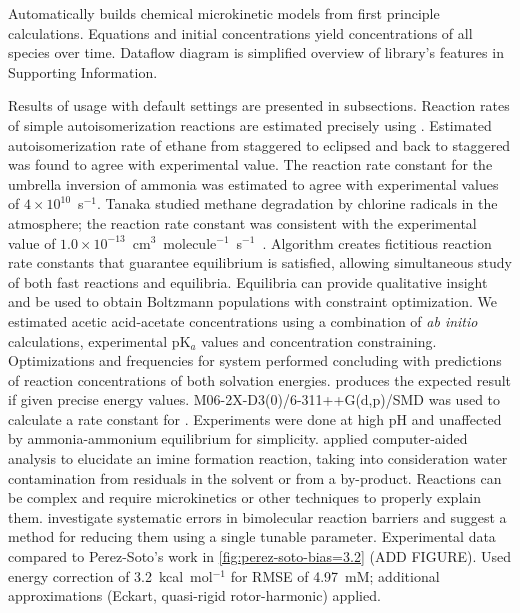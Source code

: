 Automatically builds chemical microkinetic models from first principle calculations.
Equations and initial concentrations yield concentrations of all species over time.
Dataflow diagram is simplified overview of library's features in Supporting Information.

Results of \overreact usage with default settings are presented in subsections.
Reaction rates of simple autoisomerization reactions are estimated precisely using \overreact.
Estimated autoisomerization rate of ethane from staggered to eclipsed and back to staggered was found to agree with experimental value.
The reaction rate constant for the umbrella inversion of ammonia was estimated to agree with experimental values of $4 \times 10^{10}$~s$^{-1}$.
Tanaka \cite{Tanaka_1996} studied methane degradation by chlorine radicals in the atmosphere; the reaction rate constant was consistent with the experimental value of $1.0 \times 10^{-13}$~cm$^3$~molecule$^{-1}$~s$^{-1}$~\cite{Burkholder_2020}.
Algorithm creates fictitious reaction rate constants that guarantee equilibrium is satisfied, allowing simultaneous study of both fast reactions and equilibria.
Equilibria can provide qualitative insight and be used to obtain Boltzmann populations with constraint optimization.
We estimated acetic acid-acetate concentrations using a combination of \emph{ab initio} calculations, experimental pK$_a$ values and  concentration constraining.
Optimizations and frequencies for  system performed concluding with predictions of reaction concentrations of both solvation energies.
\overreact produces the expected result if given precise energy values.
M06-2X-D3(0)/6-311++G(d,p)/SMD was used to calculate a rate constant for .
Experiments were done at high pH and unaffected by ammonia-ammonium equilibrium for simplicity.
\citeauthor{P_rez_Soto_2020} applied computer-aided analysis to elucidate an imine formation reaction, taking into consideration water contamination from residuals in the solvent or from a by-product.
Reactions can be complex and require microkinetics or other techniques to properly explain them.
\citeauthor{P_rez_Soto_2020} investigate systematic errors in bimolecular reaction barriers and suggest a method for reducing them using a single tunable parameter.
Experimental data compared to Perez-Soto's work in \cref{fig:perez-soto-bias=3.2} (ADD FIGURE).
Used energy correction of 3.2~kcal~mol$^{-1}$ for RMSE of 4.97~mM; additional approximations (Eckart, quasi-rigid rotor-harmonic) applied.
